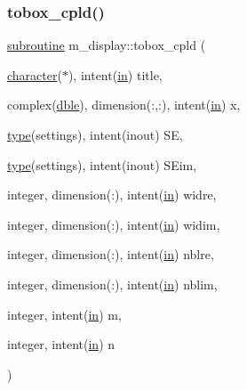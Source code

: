 \mbox{\label{namespacem__display_ac4ed462092efa64e5ce8454e7a752d10}} 
\subsubsection{\texorpdfstring{tobox\+\_\+cpld()}{tobox\_cpld()}}
{\footnotesize\ttfamily \hyperlink{M__stopwatch_83_8txt_acfbcff50169d691ff02d4a123ed70482}{subroutine} m\+\_\+display\+::tobox\+\_\+cpld (\begin{DoxyParamCaption}\item[{\hyperlink{option__stopwatch_83_8txt_abd4b21fbbd175834027b5224bfe97e66}{character}($\ast$), intent(\hyperlink{M__journal_83_8txt_afce72651d1eed785a2132bee863b2f38}{in})}]{title,  }\item[{complex(\hyperlink{namespacem__display_a46d90b75b6ccef7ccade133e5847e815}{dble}), dimension(\+:,\+:), intent(\hyperlink{M__journal_83_8txt_afce72651d1eed785a2132bee863b2f38}{in})}]{x,  }\item[{\hyperlink{stop__watch_83_8txt_a70f0ead91c32e25323c03265aa302c1c}{type}(settings), intent(inout)}]{SE,  }\item[{\hyperlink{stop__watch_83_8txt_a70f0ead91c32e25323c03265aa302c1c}{type}(settings), intent(inout)}]{S\+Eim,  }\item[{integer, dimension(\+:), intent(\hyperlink{M__journal_83_8txt_afce72651d1eed785a2132bee863b2f38}{in})}]{widre,  }\item[{integer, dimension(\+:), intent(\hyperlink{M__journal_83_8txt_afce72651d1eed785a2132bee863b2f38}{in})}]{widim,  }\item[{integer, dimension(\+:), intent(\hyperlink{M__journal_83_8txt_afce72651d1eed785a2132bee863b2f38}{in})}]{nblre,  }\item[{integer, dimension(\+:), intent(\hyperlink{M__journal_83_8txt_afce72651d1eed785a2132bee863b2f38}{in})}]{nblim,  }\item[{integer, intent(\hyperlink{M__journal_83_8txt_afce72651d1eed785a2132bee863b2f38}{in})}]{m,  }\item[{integer, intent(\hyperlink{M__journal_83_8txt_afce72651d1eed785a2132bee863b2f38}{in})}]{n }\end{DoxyParamCaption})\hspace{0.3cm}{\ttfamily [private]}}



